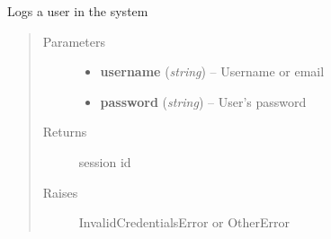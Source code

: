 \documentclass[letterpaper,10pt,english]{sphinxmanual}
\begin{document}
\begin{fulllineitems}
\label{api:apps.api.views.api_login}
Logs a user in the system
\begin{quote}\begin{description}
\item[{Parameters}] \leavevmode\begin{itemize}
\item {} 
\textbf{username} (\emph{string}) -- Username or email

\item {} 
\textbf{password} (\emph{string}) -- User's password

\end{itemize}

\item[{Returns}] \leavevmode
session id

\item[{Raises }] \leavevmode
InvalidCredentialsError or OtherError

\end{description}\end{quote}

\end{fulllineitems}

\end{document}
